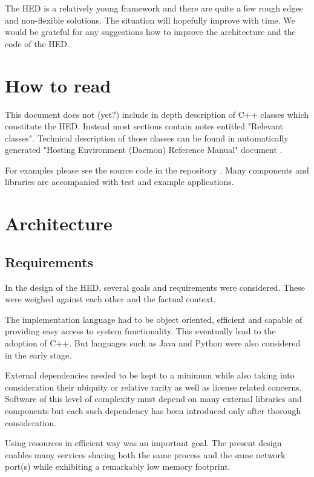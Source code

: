 \documentclass{book}
\begin{document}
The HED is a relatively young framework and there are quite a few rough edges and non-flexible solutions. The situation will hopefully improve with time. We would be grateful for any suggestions how to improve the architecture and the code of the HED. 

\chapter{How to read}

This document does not (yet?) include in depth description of C++ classes which constitute the HED. Instead most sections contain notes entitled "Relevant classes". Technical description of those classes can be found in automatically generated "Hosting Environment (Daemon) Reference Manual" document \cite{hed-api}.

For examples please see the source code in the repository \cite{svn-arc1}. Many components and libraries are accompanied with test and example applications.


\chapter{Architecture}

\section{Requirements}
In the design of the HED, several goals and requirements were considered. These were weighed against each other and the factual context.

The implementation language had to be object oriented, efficient and capable of providing easy access to system functionality. This eventually lead to the adoption of C++. But languages such as Java and Python were also considered in the early stage.

External dependencies needed to be kept to a minimum while also taking into consideration their ubiquity or relative rarity as well as license related concerns. Software of this level of complexity must depend on many external libraries and components but each such dependency has been introduced only after thorough consideration.

Using resources in efficient way was an important goal. The present design enables many services sharing both the same process and the same network port(s) while exhibiting a remarkably low memory footprint.
\end{document}
